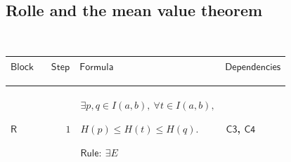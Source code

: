 \documentclass[12pt,reqno]{amsart}
\theoremstyle{blueplain}
\numberwithin{equation}{section}
\newlength{\FTCOneColumnBody}
\begin{document}
{\scriptsize \ }

\subsection{\protect\scriptsize Rolle and the mean value theorem}

{\scriptsize {\ }}

{\scriptsize \setlength{\parskip}{0pt}\nointerlineskip
\noindent 
\begin{tabular}{|@{}>{\centering\arraybackslash}m{\FTCOneColumnBody}|}
\hline
$\displaystyle \mathsf{RolleAndMeanValueProofs}$ \\ \hline
\end{tabular}%
}

{\scriptsize \setlength{\parskip}{0pt}\nointerlineskip
\noindent 
\begin{tabular}{|@{}>{\centering\arraybackslash}m{0.10658\linewidth}|>{\centering\arraybackslash}m{0.03553\linewidth}|>{\centering\arraybackslash}m{0.52105\linewidth}|>{\centering\arraybackslash}m{0.23684\linewidth}|}
\hline
$\displaystyle \mathsf{Block}$ & $\displaystyle \mathsf{Step}$ & $%
\displaystyle \mathsf{Formula}$ & $\displaystyle \mathsf{Dependencies}$ \\ 
\hline
\end{tabular}%
}

{\scriptsize \setlength{\parskip}{0pt}\nointerlineskip
\noindent 
\begin{tabular}{|@{}>{\centering\arraybackslash}m{\FTCOneColumnBody}|}
\hline
$\displaystyle \mathsf{Context\_Rolle}:=$\par$\displaystyle a<b,\quad\mathsf{%
Cont}(H;a,b),\quad\mathsf{Diff}(H;a,b),$\par$\displaystyle H(a)=H(b).$ \\ 
\hline
\end{tabular}%
}

{\scriptsize \setlength{\parskip}{0pt}\nointerlineskip
\noindent 
\begin{tabular}{|@{}>{\centering\arraybackslash}m{0.10658\linewidth}|>{\centering\arraybackslash}m{0.03553\linewidth}|>{\centering\arraybackslash}m{0.52105\linewidth}|>{\centering\arraybackslash}m{0.23684\linewidth}|}
\hline
\hypertarget{proof:R1}{$\displaystyle \mathsf{R}$} & $\displaystyle 1$ & $%
\displaystyle \exists p,q\in I(a,b),\ \forall t\in I(a,b),$\par$%
\displaystyle H(p)\le H(t)\le H(q).$\par$\displaystyle \mathsf{Rule}:\
\exists E$ & \hyperlink{proof:C3}{$\displaystyle \mathsf{C3}$}, \hyperlink{proof:C4}%
{$\displaystyle \mathsf{C4}$} \\ \hline
\end{tabular}%
}
\end{document}
